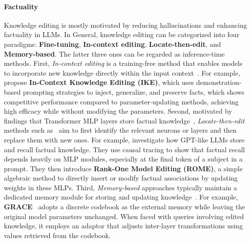 \paragraph{Factuality}
Knowledge editing is mostly motivated by reducing hallucinations and enhancing factuality in LLMs. In General, knowledge editing can be categorized into four paradigms: \textbf{Fine-tuning}, \textbf{In-context editing}, \textbf{Locate-then-edit}, and \textbf{Memory-based}. The latter three ones can be regarded as inference-time methods.
First, \textit{In-context editing} is a training-free method that enables models to incorporate new knowledge directly within the input context~\citep{zheng2023can,shi2024retrieval,fei2024retrieval}. For example, \citet{zheng2023can} propose \textbf{In-Context Knowledge Editing (IKE)}, which uses demonstration-based prompting strategies to inject, generalize, and preserve facts, which shows competitive  performance compared to parameter-updating methods, achieving high efficacy while without modifying the parameters.  Second, motivated by findings that Transformer MLP layers store factual knowledge~\citep{geva2020transformer,ma2024perturbation}, \textit{Locate-then-edit} methods such as~\citep{meng2022locating,meng2022memit} aim to first identify the relevant neurons or layers and then replace them with new ones. For example, \citet{meng2022locating} investigate how GPT-like LLMs store and recall factual knowledge. They use causal tracing to show that factual recall depends heavily on MLP modules, especially at the final token of a subject in a prompt. They then introduce \textbf{Rank-One Model Editing (ROME)}, a simple algebraic method to directly insert or modify factual associations by updating weights in these MLPs. Third, \textit{Memory-based} approaches typically maintain a dedicated memory module for storing and updating knowledge~\citep{hartvigsen2024aging,wang2024wise}. For example, \textbf{GRACE}~\citep{hartvigsen2024aging} adopts a discrete codebook as the external memory while leaving the original model parameters unchanged. When faced with queries involving edited knowledge, it employs an adaptor that adjusts inter-layer transformations using values retrieved from the codebook.



